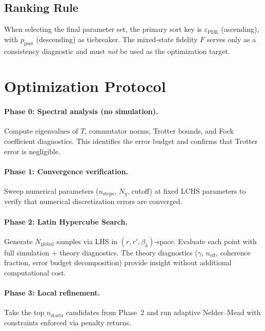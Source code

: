 \documentclass[11pt]{article}
\newcommand{\eps}{\varepsilon}
\begin{document}
\subsection{Ranking Rule}
When selecting the final parameter set, the primary sort key is
$\eps_{\mathrm{PDE}}$ (ascending), with $p_{\mathrm{post}}$ (descending) as
tiebreaker.  The mixed-state fidelity $F$ serves only as a consistency diagnostic
and must \emph{not} be used as the optimization target.

\section{Optimization Protocol}

\paragraph{Phase 0: Spectral analysis (no simulation).}
Compute eigenvalues of $T$, commutator norms, Trotter bounds, and Fock coefficient
diagnostics.  This identifies the error budget and confirms that Trotter error is
negligible.

\paragraph{Phase 1: Convergence verification.}
Sweep numerical parameters ($n_{\mathrm{steps}}$, $N_q$, cutoff) at fixed LCHS
parameters to verify that numerical discretization errors are converged.

\paragraph{Phase 2: Latin Hypercube Search.}
Generate $N_{\mathrm{global}}$ samples via LHS in $(r, r', \beta_k)$-space.
Evaluate each point with full simulation + theory diagnostics.  The theory
diagnostics ($\gamma$, $n_{\mathrm{eff}}$, coherence fraction, error budget
decomposition) provide insight without additional computational cost.

\paragraph{Phase 3: Local refinement.}
Take the top $n_{\mathrm{starts}}$ candidates from Phase~2 and run adaptive
Nelder--Mead with constraints enforced via penalty returns.
\end{document}
